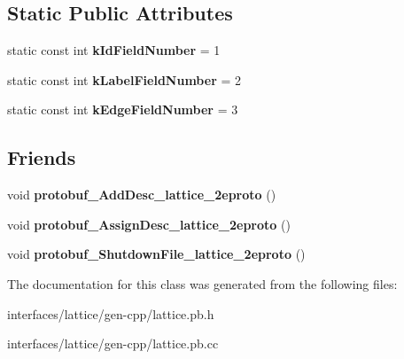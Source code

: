\subsection*{Static Public Attributes}
\begin{DoxyCompactItemize}
\item 
\hypertarget{classlattice_1_1Lattice__Node_a5f2df3e8557da8697c9bedaf6d7e9e32}{
static const int {\bfseries kIdFieldNumber} = 1}
\label{classlattice_1_1Lattice__Node_a5f2df3e8557da8697c9bedaf6d7e9e32}

\item 
\hypertarget{classlattice_1_1Lattice__Node_ac19a4aa98d9ef4fee4032e4e493d53d1}{
static const int {\bfseries kLabelFieldNumber} = 2}
\label{classlattice_1_1Lattice__Node_ac19a4aa98d9ef4fee4032e4e493d53d1}

\item 
\hypertarget{classlattice_1_1Lattice__Node_a76b647ba9708e295b6b4223635dca164}{
static const int {\bfseries kEdgeFieldNumber} = 3}
\label{classlattice_1_1Lattice__Node_a76b647ba9708e295b6b4223635dca164}

\end{DoxyCompactItemize}
\subsection*{Friends}
\begin{DoxyCompactItemize}
\item 
\hypertarget{classlattice_1_1Lattice__Node_a19e63fb37025879e023cad88064187cf}{
void {\bfseries protobuf\_\-AddDesc\_\-lattice\_\-2eproto} ()}
\label{classlattice_1_1Lattice__Node_a19e63fb37025879e023cad88064187cf}

\item 
\hypertarget{classlattice_1_1Lattice__Node_a3b0386e09a9fefcf1bdce658cfc480b2}{
void {\bfseries protobuf\_\-AssignDesc\_\-lattice\_\-2eproto} ()}
\label{classlattice_1_1Lattice__Node_a3b0386e09a9fefcf1bdce658cfc480b2}

\item 
\hypertarget{classlattice_1_1Lattice__Node_a3c7b187721d0704ceb19ff889729d35a}{
void {\bfseries protobuf\_\-ShutdownFile\_\-lattice\_\-2eproto} ()}
\label{classlattice_1_1Lattice__Node_a3c7b187721d0704ceb19ff889729d35a}

\end{DoxyCompactItemize}


The documentation for this class was generated from the following files:\begin{DoxyCompactItemize}
\item 
interfaces/lattice/gen-\/cpp/lattice.pb.h\item 
interfaces/lattice/gen-\/cpp/lattice.pb.cc\end{DoxyCompactItemize}
